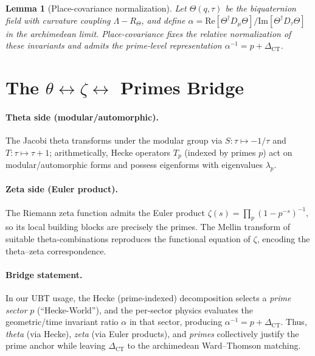\documentclass[11pt,a4paper]{article}
\newtheorem{lemma}{Lemma}
\begin{document}
\begin{lemma}[Place-covariance normalization]\label{lem:place-cov}
Let $\Theta(q,\tau)$ be the biquaternion field with curvature coupling $\Lambda\!-\!R_\Theta$, and define
$\displaystyle \alpha = \mathrm{Re}[\Theta^\dagger D_\mu\Theta]/\mathrm{Im}[\Theta^\dagger D_\tau\Theta]$ in the archimedean limit.
Place-covariance fixes the relative normalization of these invariants and admits the prime-level representation $\alpha^{-1}=p+\Delta_{\mathrm{CT}}$.
\end{lemma}

\section{The \texorpdfstring{$\theta \leftrightarrow \zeta \leftrightarrow$}{theta <-> zeta <->} Primes Bridge}
\paragraph{Theta side (modular/automorphic).}
The Jacobi theta transforms under the modular group via $S:\tau\mapsto -1/\tau$ and $T:\tau\mapsto \tau+1$;
arithmetically, Hecke operators $T_p$ (indexed by primes $p$) act on modular/automorphic forms and possess eigenforms with eigenvalues $\lambda_p$.

\paragraph{Zeta side (Euler product).}
The Riemann zeta function admits the Euler product
\(
\zeta(s)=\prod_{p}(1-p^{-s})^{-1},
\)
so its local building blocks are precisely the primes. The Mellin transform of suitable theta-combinations reproduces the functional equation of $\zeta$, encoding the theta--zeta correspondence.

\paragraph{Bridge statement.}
In our UBT usage, the Hecke (prime-indexed) decomposition selects a \emph{prime sector} $p$ (``Hecke-World''),
and the per-sector physics evaluates the geometric/time invariant ratio \(\alpha\) in that sector, producing \(\alpha^{-1}=p+\Delta_{\mathrm{CT}}\).
Thus, \emph{theta} (via Hecke), \emph{zeta} (via Euler products), and \emph{primes} collectively justify the prime anchor while leaving
$\Delta_{\mathrm{CT}}$ to the archimedean Ward--Thomson matching.
\end{document}
